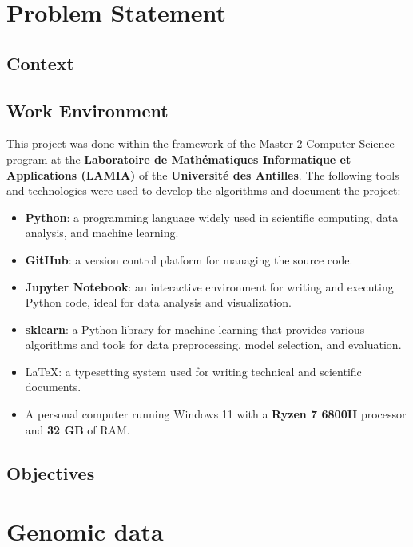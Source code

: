 \chapter{Problem Statement}
\label{chap:problem_statement}

\section{Context}
\label{sec:context}

\section{Work Environment}
\label{sec:work_environment}

This project was done within the framework of the Master 2 Computer Science program at the
\textbf{Laboratoire de Mathématiques Informatique et Applications (LAMIA)} of the \textbf{Université des Antilles}.
The following tools and technologies were used to develop the algorithms and document the project:

\begin{itemize}
	\item \textbf{Python}: a programming language widely used in scientific computing, data analysis, and machine learning.
	\item \textbf{GitHub}: a version control platform for managing the source code.
	\item \textbf{Jupyter Notebook}: an interactive environment for writing and executing Python code, ideal for data analysis and
	      visualization.
	\item \textbf{sklearn}: a Python library for machine learning that provides various algorithms and tools for data preprocessing,
	      model selection, and evaluation.
	\item \LaTeX : a typesetting system used for writing technical and scientific documents.
	\item A personal computer running Windows 11 with a \textbf{Ryzen 7 6800H} processor and \textbf{32 GB} of RAM.
\end{itemize}

\section{Objectives}
\label{sec:objectives}

\chapter{Genomic data}
\label{chap:genomic_data}

